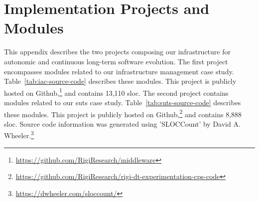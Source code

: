 \label{appendix:implementation-package}

\section{Implementation Projects and Modules}

This appendix describes the two projects composing our infrastructure for autonomic and continuous long-term software evolution. The first project encompasses modules related to our infrastructure management case study. Table~\ref{tab:iac-source-code} describes these modules. This project is publicly hosted on Github,\footnote{\url{https://github.com/RigiResearch/middleware}} and contains 13,110 \gls{sloc}. The second project contains modules related to our \gls{suts} case study. Table~\ref{tab:suts-source-code} describes these modules. This project is publicly hosted on Github,\footnote{\url{https://github.com/RigiResearch/rigi-dt-experimentation-cps-code}} and contains 8,888 \gls{sloc}. Source code information was generated using 'SLOCCount' by David A. Wheeler.\footnote{\url{https://dwheeler.com/sloccount/}}

